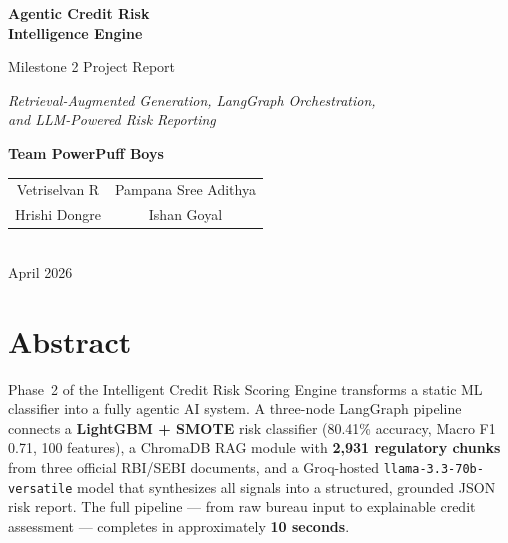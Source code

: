 \documentclass[11pt,a4paper]{article}
\begin{document}
\begin{titlepage}
    \centering
    \vspace*{2.5cm}

    {\Huge\bfseries\color{titleblue}
        Agentic Credit Risk\\[0.3em]
        Intelligence Engine\\[1.2em]
    }

    {\Large Milestone 2 Project Report\\[1.8em]}

    {\large\itshape
        Retrieval-Augmented Generation, LangGraph Orchestration,\\
        and LLM-Powered Risk Reporting\\[2.5em]
    }

    {\Large\bfseries Team PowerPuff Boys\\[1.2em]}

    \begin{tabular}{cc}
        {\normalsize Vetriselvan R} & {\normalsize Pampana Sree Adithya} \\[0.5em]
        {\normalsize Hrishi Dongre} & {\normalsize Ishan Goyal} \\
    \end{tabular}\\[1.5em]

    \vfill
    {\large April 2026}
\end{titlepage}

\setcounter{tocdepth}{2}
\tableofcontents
\newpage

\section{Abstract}

Phase~2 of the Intelligent Credit Risk Scoring Engine transforms a static ML classifier into a fully agentic AI system. A three-node LangGraph pipeline connects a \textbf{LightGBM + SMOTE} risk classifier (80.41\% accuracy, Macro F1 0.71, 100 features), a ChromaDB RAG module with \textbf{2,931 regulatory chunks} from three official RBI/SEBI documents, and a Groq-hosted \texttt{llama-3.3-70b-versatile} model that synthesizes all signals into a structured, grounded JSON risk report. The full pipeline --- from raw bureau input to explainable credit assessment --- completes in approximately \textbf{10 seconds}.

\end{document}
